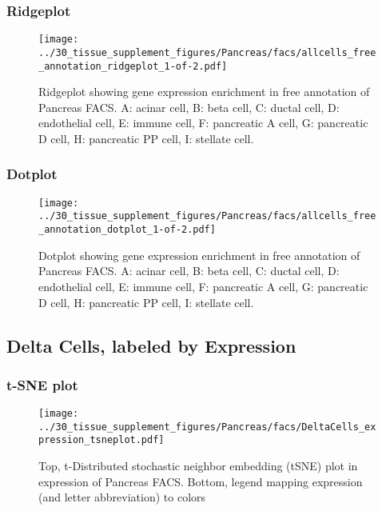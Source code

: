 \newpage
\newpage
\subsubsection{Ridgeplot}
\begin{figure}[h]
\centering
\texttt{[image: ../30\_tissue\_supplement\_figures/Pancreas/facs/allcells\_free\_annotation\_ridgeplot\_1-of-2.pdf]}

\caption{ Ridgeplot  showing gene expression enrichment in free annotation of Pancreas FACS. A: acinar cell, B: beta cell, C: ductal cell, D: endothelial cell, E: immune cell, F: pancreatic A cell, G: pancreatic D cell, H: pancreatic PP cell, I: stellate cell.}
\end{figure}


\newpage
\newpage
\subsubsection{Dotplot}
\begin{figure}[h]
\centering
\texttt{[image: ../30\_tissue\_supplement\_figures/Pancreas/facs/allcells\_free\_annotation\_dotplot\_1-of-2.pdf]}

\caption{ Dotplot  showing gene expression enrichment in free annotation of Pancreas FACS. A: acinar cell, B: beta cell, C: ductal cell, D: endothelial cell, E: immune cell, F: pancreatic A cell, G: pancreatic D cell, H: pancreatic PP cell, I: stellate cell.}
\end{figure}


\newpage
\subsection{Delta Cells, labeled by Expression}

\subsubsection{t-SNE plot}
\begin{figure}[h]
\centering
\texttt{[image: ../30\_tissue\_supplement\_figures/Pancreas/facs/DeltaCells\_expression\_tsneplot.pdf]}

\caption{Top, t-Distributed stochastic neighbor embedding (tSNE) plot  in expression of Pancreas FACS. Bottom, legend mapping expression (and letter abbreviation) to colors}
\end{figure}

